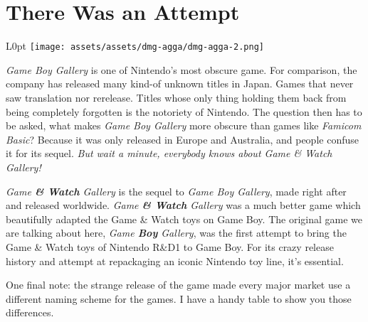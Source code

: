 \documentclass{book}
\let\oldcenter\center
\let\oldendcenter\endcenter
\renewenvironment{center}{\setlength\topsep{0pt}\oldcenter}{\oldendcenter}
\begin{document}
\newpage\FloatBarrier\needspace{10mm}\section*{There Was an Attempt}\nopagebreak[4]
\begin{wrapfigure}{L}{0pt} \texttt{[image: assets/assets/dmg-agga/dmg-agga-2.png]}\end{wrapfigure}
\emph{Game Boy Gallery} is one of Nintendo’s most obscure game. For comparison, the company has released many kind-of unknown titles in Japan. Games that never saw translation nor rerelease. Titles whose only thing holding them back from being completely forgotten is the notoriety of Nintendo. The question then has to be asked, what makes \emph{Game Boy Gallery} more obscure than games like \emph{Famicom Basic}? Because it was only released in Europe and Australia, and people confuse it for its sequel. \emph{But wait a minute, everybody knows about Game \& Watch Gallery!}

\begin{center}
\vspace{8pt}
\quad\vspace{4pt}
\end{center}

\emph{Game \textbf{\& Watch} Gallery} is the sequel to \emph{Game Boy Gallery}, made right after and released worldwide. \emph{Game \textbf{\& Watch} Gallery} was a much better game which beautifully adapted the Game \& Watch toys on Game Boy. The original game we are talking about here, \emph{Game \textbf{Boy} Gallery}, was the first attempt to bring the Game \& Watch toys of Nintendo R\&D1 to Game Boy. For its crazy release history and attempt at repackaging an iconic Nintendo toy line, it’s essential.

One final note: the strange release of the game made every major market use a different naming scheme for the games. I have a handy table to show you those differences.
\end{document}
